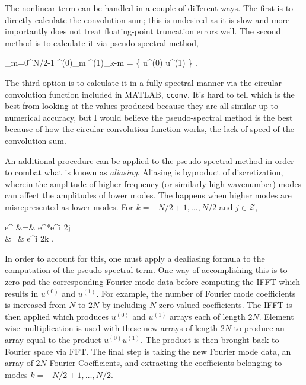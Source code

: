 The nonlinear term can be handled in a couple of different ways. The first is to
directly calculate the convolution sum; this is undesired as it is slow and more
importantly does not treat floating-point truncation errors well. The second method
is to calculate it via pseudo-spectral method,

\beq
\sum_{m=0}^{N/2-1} \utensor^{(0)}_m \utensor^{(1)}_{k-m} =   \left\{ u^{(0)} u^{(1)} \right\} .
\label{e-MNGre13}
\eeq

The third option is to calculate it in a fully spectral manner via the circular
convolution function included in MATLAB, \texttt{cconv}. It's hard to tell which is
the best from looking at the values produced because they are all similar up to numerical
accuracy, but I would believe the pseudo-spectral method is the best because of how the
circular convolution function works, the lack of speed of the convolution sum.


An additional procedure can be applied to the pseudo-spectral method in order to
combat what is known as \textit{aliasing}. Aliasing is byproduct of discretization,
wherein the amplitude of higher frequency (or similarly high wavenumber) modes
can affect the amplitudes of lower modes. The happens when higher modes are
misrepresented as lower modes. For $k = -N/2+1, \ldots, N/2$ and  $j \in \mathcal{Z}$,

\bea
e^{} &=& e^{}*e^{i 2\pi j}\\
 &=& e^{i 2\pi k }. \nonumber
\eea

In order to account for this, one must apply a dealiasing formula to the computation
of the pseudo-spectral term. One way of accomplishing this is to zero-pad the
corresponding Fourier mode data before computing the IFFT which results in $u^{(0)}$ and $u^{(1)}$.
For example, the number of Fourier mode coefficients is increased from $N$ to $2N$
by including $N$ zero-valued coefficients. The IFFT is then applied which produces
$u^{(0)}$ and $u^{(1)}$ arrays each of length $2N$. Element wise multiplication
is used with these new arrays of length $2N$ to produce an array equal to the
product $u^{(0)} u^{(1)}$. The product is then brought back to Fourier space via FFT.
The final step is taking the new Fourier mode data, an array of $2N$ Fourier
Coefficients, and extracting the coefficients belonging to modes $k = -N/2+1, \ldots, N/2$.


